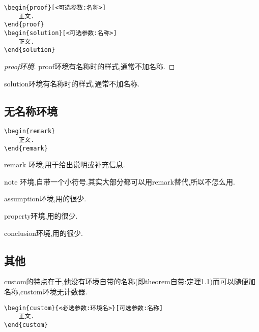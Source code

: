 \documentclass[lang=cn,12pt,scheme=chinese,mode=simple,black]{elegantbook}
\begin{document}
\begin{lstlisting}
\begin{proof}[<可选参数:名称>]
    正文.
\end{proof}
\begin{solution}[<可选参数:名称>]
    正文.
\end{solution}
\end{lstlisting}

\begin{resultbox}
    \begin{proof}[proof环境]
        proof环境有名称时的样式,通常不加名称.
    \end{proof}
    \begin{solution}[solution环境]
        solution环境有名称时的样式,通常不加名称.
    \end{solution}
\end{resultbox}

\subsection{无名称环境}
\begin{lstlisting}
\begin{remark}
    正文.
\end{remark}
\end{lstlisting}
\begin{remark}
    remark 环境,用于给出说明或补充信息.
\end{remark}
\begin{note}
    note 环境,自带一个小符号.其实大部分都可以用remark替代,所以不怎么用.
\end{note}

\begin{assumption}
    assumption环境,用的很少.
\end{assumption}

\begin{property}
    property环境,用的很少.
\end{property}

\begin{conclusion}
    conclusion环境,用的很少.
\end{conclusion}

\subsection{其他}
custom的特点在于,他没有环境自带的名称(即theorem自带:定理1.1)而可以随便加名称,custom环境无计数器.
\begin{lstlisting}
\begin{custom}{<必选参数:环境名>}[可选参数:名称]
    正文.
\end{custom}
\end{lstlisting}
\end{document}
